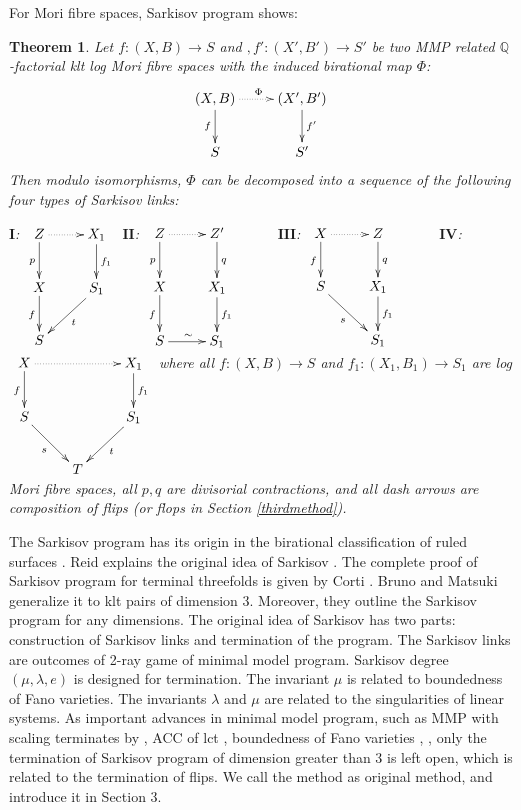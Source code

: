 \documentclass[11pt]{amsart}
\newtheorem{thm}[defn]{Theorem}
\begin{document}
For Mori fibre spaces, Sarkisov program shows:
\begin{thm}\label{main}
  Let $ f:(X,B)\to S$ and $,f':(X',B')\to S' $ be two MMP related $ \mathbb{Q} $-factorial klt log Mori fibre spaces with the induced  birational map $\Phi$:
  \[ \xymatrix{
    (X,B)\ar[d]_f\ar@{.>}[r]^\Phi&(X',B')\ar[d]^{f'}\\
    S&S'} \]
  Then modulo isomorphisms, $ \Phi  $ can be decomposed into a sequence of the following four types of Sarkisov links:


  $\textbf{I}$:
  $\xymatrix{
    Z\ar[d]_p\ar@{.>}[r]&X_1\ar[d]^{f_1}\\
    X\ar[d]_f&S_1\ar[dl]^{t}\\
  S &}$
  $\textbf{II}$:
  $\xymatrix{
    Z\ar[d]_p\ar@{.>}[r]&Z'\ar[d]^{q}&\\
    X\ar[d]_{f}&X_1\ar[d]^{f_1}\\
    S\ar[r]^{\sim}&S_1}$
  $\textbf{III}$:
  $
  \xymatrix{
    X\ar@{.>}[r]\ar[d]_f& Z\ar[d]^q& \\
    S\ar[rd]_{s}         & X_{1}\ar[d]^{f_{1}}&\\
    &S_{1}
  }
  $
  $\textbf{IV}$:
  $\xymatrix{
    X\ar[d]_f\ar@{.>}[rr]&&X_1\ar[d]^{f_1}\\
    S\ar[dr]_{s}&&S_1\ar[dl]^{t}\\
    &T &}$
    where all $ f:(X,B)\to S $ and $ f_1:(X_1,B_1)\to S_1 $ are log Mori fibre spaces, all $ p,q $ are divisorial contractions, and all dash arrows are composition of flips (or flops in Section \ref{thirdmethod}). 
  \end{thm}

The Sarkisov program has its origin in the birational classification of ruled surfaces \cite{sarkisovCONICBUNDLESTRUCTURES1983}. 
Reid \cite{reidBirationalgeometry} explains the original idea of Sarkisov \cite{sarkisovBirationalmapsofstandardQfanoFibering}. 
The complete proof of Sarkisov program for terminal threefolds is given  by Corti \cite{cortiFactoringBirationalMaps}. 
Bruno and Matsuki \cite{brunoLogSarkisovProgram1995} generalize it to klt pairs of dimension $3$. Moreover, they outline the Sarkisov program for any dimensions. The original idea of Sarkisov has two parts: construction of Sarkisov links and termination of the program. The Sarkisov links are outcomes of 2-ray game of minimal model program. Sarkisov degree $(\mu,\lambda, e)$ is designed for termination. The invariant $\mu$ is related to boundedness of Fano varieties. The invariants $\lambda$ and $\mu$ are related to the singularities of linear systems.
As important advances in minimal model program, such as MMP with scaling terminates by \cite{BCHM10}, ACC of lct \cite{HMX14}, boundedness of Fano varieties \cite{Bir19}, \cite{birkarSingularitiesLinearSystems2020}, only the termination of Sarkisov program of dimension greater than 3 is left open, which is related to the termination of flips. We call the method as original method, and introduce it in Section 3.
\end{document}
